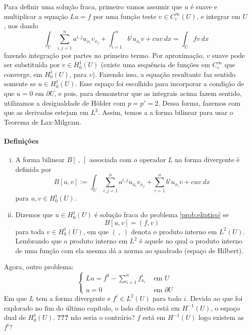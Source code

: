 \documentclass[a4paper, 11pt]{book}
\newcommand{\pu}{\partial U}
\begin{document}
Para definir uma solução fraca, primeiro vamos assumir que $u$ é suave e multiplicar a equação $Lu=f$ por uma função teste $v \in C^\infty_c(U)$, e integrar em $U$, nos dando
\[
\int_U \sum_{i,j=1}^n a^{i,j} u_{x_i} v_{x_j} + \int_{i=1}^n b^i u_{x_i} v + cuv\ dx = \int_U fv \ dx 	
\]
fazendo integração por partes no primeiro termo. Por aproximação, $v$ suave pode ser substituída por $v \in H^1_0(U)$ (existe uma sequência de funções em $C^\infty_c$ que converge, em $H^1_0(U)$, para $v$). Fazendo isso, a equação resultante faz sentido somente se $u \in H^1_0(U)$. Esse espaço foi escolhido para incorporar a condição de que $u=0$ em $\pu$, e pois, para demonstrar que as integrais acima fazem sentido, utilizamos a desigualdade de Hölder com $p=p'=2$. Dessa forma, fazemos com que as derivadas estejam em $L^2$. Assim, temos a a forma bilinear para usar o Teorema de Lax-Milgram.

\paragraph{Definições}
\begin{enumerate}[(i)]
	\item A forma bilinear $B[\ {,} \ ]$ associada com o operador $L$ na forma divergente é definida por \[
	B[u,v] := \int_U \sum_{i,j=1}^{n} a^{i,j} u_{x_i} v_{x_j} + \sum_{i=1}^{n}b^i u_{x_i}v + cuv \ dx	
	\] para $u,v \in H^1_0(U)$.

	\item Dizemos que $u \in H^1_0(U)$ é solução fraca do problema \eqref{prob:eliptico} se \[
	B[u,v] = (f,v)
	\] para toda $v \in H^1_0(U)$, em que $(\ {,} \ )$ denota o produto interno em $L^2(U)$. Lembrando que o produto interno em $L^2$ é aquele no qual o produto interno de uma função com ela mesma dá a norma ao quadrado (espaço de Hilbert).
\end{enumerate}

Agora, outro problema: 
\begin{equation}\label{prob:eliptico-h10}
	\begin{cases}
		Lu=f^0 - \sum_{i=1}^{n}f_{x_i}^i & \text{ em } U \\
		u=0 & \text{ em } \partial U
	\end{cases}
\end{equation}
Em que $L$ tem a forma divergente e $f^i \in L^2(U)$ para todo $i$. Devido ao que foi explorado no fim do último capítulo, o lado direito está em $H^{-1}(U)$, o espaço dual de $H^1_0(U)$. \textbf{???} não seria o contrário? $f$ está em $H^{-1}(U)$ logo existem as $f^i$?
\end{document}
